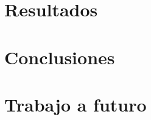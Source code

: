 \documentclass[10pt]{book}
\begin{document}
\chapter{Resultados}\label{chp:resultados} 
\hypertarget{chp:resultados}{}

\chapter{Conclusiones}\label{chp:resultados} 
\hypertarget{chp:conclusiones}{}

\chapter{Trabajo a futuro}\label{chp:resultados} 
\hypertarget{chp:trabajoFuturo}{}



\end{document}
